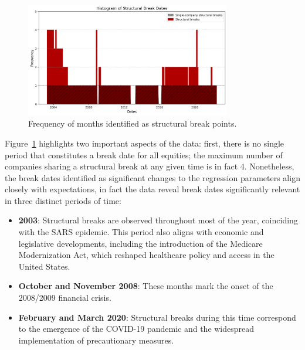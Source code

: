 \begin{figure}[h!]
    \centering
    \includegraphics[width=0.8\textwidth]{images/struct_break_freqs.png}
    \caption{Frequency of months identified as structural break points.}\label{fig:struct_break_freqs}
\end{figure}

Figure~\ref{fig:struct_break_freqs} highlights two important aspects of the data: 
first, there is no single period that constitutes a break date for all equities; the maximum number of companies sharing a 
structural break at any given time is in fact 4. 
Nonetheless, the break dates identified as significant changes to the regression parameters align closely with expectations,
in fact the data reveal break dates significantly relevant in three distinct periods of time:
\begin{itemize}
    \item  \textbf{2003}: Structural breaks are observed throughout most of the year, coinciding with the SARS epidemic. 
    This period also aligns with economic and legislative developments, including the introduction of the Medicare
    Modernization Act, which reshaped healthcare policy and access in the United States.
    \item \textbf{October and November 2008}: These months mark the onset of the 2008/2009 financial crisis.
    \item \textbf{February and March 2020}: Structural breaks during this time correspond to the emergence of the COVID-19
    pandemic and the widespread implementation of precautionary measures.
\end{itemize}

